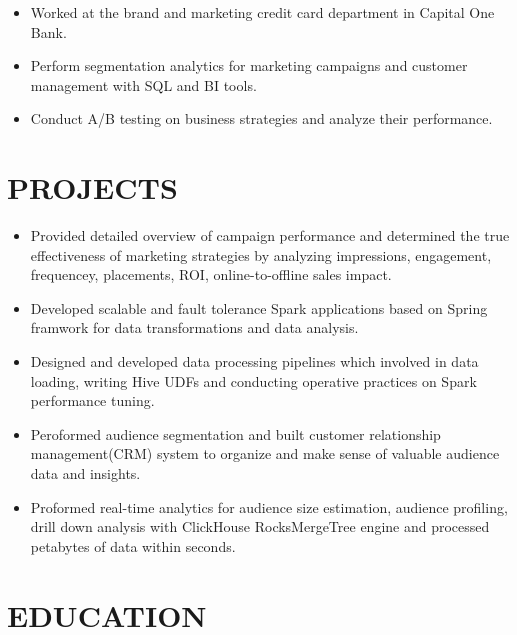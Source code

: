 \documentclass{resume}
\begin{document}
\begin{itemize}
  \item Worked at the brand and marketing credit card department in Capital One Bank.
  \item Perform segmentation analytics for marketing campaigns and customer management with SQL and BI tools.
  \item Conduct A/B testing on business strategies and analyze their performance.
\end{itemize}

\section{PROJECTS}
\begin{itemize}
  \item Provided detailed overview of campaign performance and determined the true effectiveness of marketing strategies by analyzing impressions, engagement, frequencey, placements, ROI, online-to-offline sales impact.
  \item Developed scalable and fault tolerance Spark applications based on Spring framwork for data transformations and data analysis.
  \item Designed and developed data processing pipelines which involved in data loading, writing Hive UDFs and conducting operative practices on Spark performance tuning.
\end{itemize}

\begin{itemize}
  \item Peroformed audience segmentation and built customer relationship management(CRM) system to organize and make sense of valuable audience data and insights.
  \item Proformed real-time analytics for audience size estimation, audience profiling, drill down analysis with ClickHouse RocksMergeTree engine and processed petabytes of data within seconds.
\end{itemize}

\section{EDUCATION}
\end{document}
